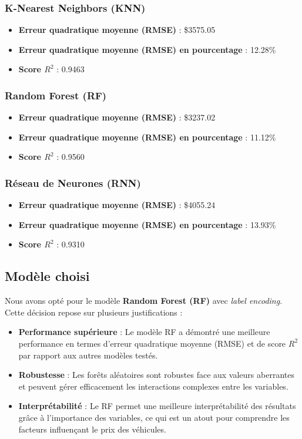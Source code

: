 \documentclass[12pt]{report}
\begin{document}
\subsubsection{K-Nearest Neighbors (KNN)}

\begin{itemize}
    \item \textbf{Erreur quadratique moyenne (RMSE)} : \$3575.05
    \item \textbf{Erreur quadratique moyenne (RMSE) en pourcentage} : 12.28\%
    \item \textbf{Score \( R^2 \)} : 0.9463
\end{itemize}

\subsubsection{Random Forest (RF)}

\begin{itemize}
    \item \textbf{Erreur quadratique moyenne (RMSE)} : \$3237.02
    \item \textbf{Erreur quadratique moyenne (RMSE) en pourcentage} : 11.12\%
    \item \textbf{Score \( R^2 \)} : 0.9560
\end{itemize}

\subsubsection{Réseau de Neurones (RNN)}

\begin{itemize}
    \item \textbf{Erreur quadratique moyenne (RMSE)} : \$4055.24
    \item \textbf{Erreur quadratique moyenne (RMSE) en pourcentage} : 13.93\%
    \item \textbf{Score \( R^2 \)} : 0.9310
\end{itemize}

\subsection{Modèle choisi}

Nous avons opté pour le modèle \textbf{Random Forest (RF)} avec \textit{label encoding}. Cette décision repose sur plusieurs justifications :

\begin{itemize}
    \item \textbf{Performance supérieure} : Le modèle RF a démontré une meilleure performance en termes d'erreur quadratique moyenne (RMSE) et de score \( R^2 \) par rapport aux autres modèles testés.
    \item \textbf{Robustesse} : Les forêts aléatoires sont robustes face aux valeurs aberrantes et peuvent gérer efficacement les interactions complexes entre les variables.
    \item \textbf{Interprétabilité} : Le RF permet une meilleure interprétabilité des résultats grâce à l'importance des variables, ce qui est un atout pour comprendre les facteurs influençant le prix des véhicules.
\end{itemize}
\end{document}
